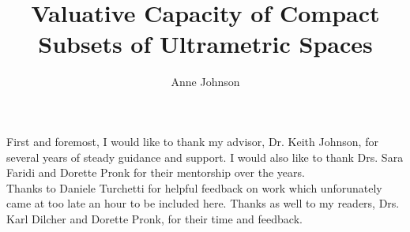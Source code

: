 \documentclass[12pt, glossary]{dalthesis}
\theoremstyle{plain}
\theoremstyle{definition}
\begin{document}
\title{Valuative Capacity of Compact Subsets of Ultrametric Spaces}
\author{Anne Johnson}

\mcs





\nolistoftables
\nolistoffigures

\frontmatter


\begin{abstract}

\end{abstract}

\printglossary

\begin{acknowledgements}
  First and foremost, I would like to thank my advisor, Dr. Keith Johnson, for several years of steady guidance and support. I would also like to thank Drs. Sara Faridi and Dorette Pronk for their mentorship over the years.\\
  
 Thanks to Daniele Turchetti for helpful feedback on work which unforunately came at too late an hour to be included here. Thanks as well to my readers, Drs. Karl Dilcher and Dorette Pronk, for their time and feedback.\\
 

\end{acknowledgements}

\mainmatter
\end{document}
